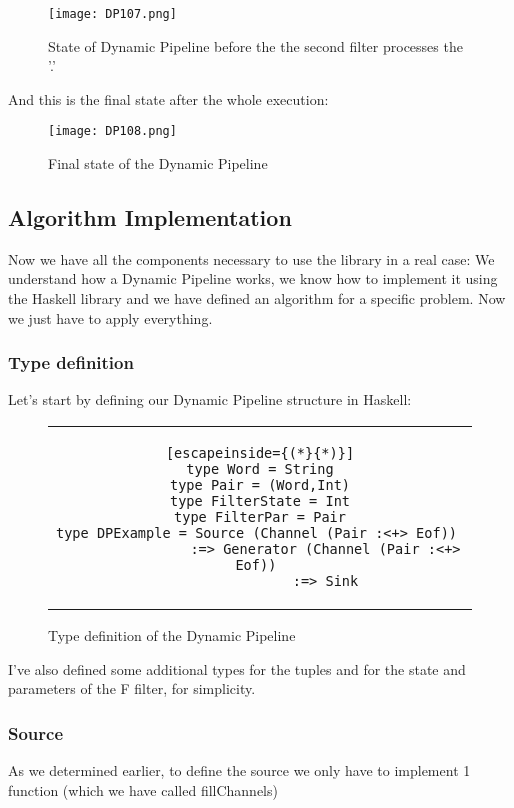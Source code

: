 \begin{figure}[H]
    \centering
    \texttt{[image: DP107.png]}
    \caption{State of Dynamic Pipeline before the the second filter processes the '.'}
    \label{fig:DP107}
\end{figure}

And this is the final state after the whole execution:

\begin{figure}[H]
    \centering
    \texttt{[image: DP108.png]}
    \caption{Final state of the Dynamic Pipeline}
    \label{fig:DP108}
\end{figure}

\subsection{Algorithm Implementation}
Now we have all the components necessary to use the library in a real case: We understand how a Dynamic Pipeline works, we know how to implement it using the Haskell library and we have defined an algorithm for a specific problem. Now we just have to apply everything.
\subsubsection*{Type definition}
Let's start by defining our Dynamic Pipeline structure in Haskell:

\begin{figure}[H]
    \begin{tabular}{c}
        \begin{lstlisting}[escapeinside={(*}{*)}]
type Word = String
type Pair = (Word,Int)
type FilterState = Int
type FilterPar = Pair
type DPExample = Source (Channel (Pair :<+> Eof)) 
                :=> Generator (Channel (Pair :<+> Eof)) 
                :=> Sink
        \end{lstlisting}
    \end{tabular}
    \caption{Type definition of the Dynamic Pipeline}
    \label{fig:HC16}
\end{figure}

I've also defined some additional types for the tuples and for the state and parameters of the F filter, for simplicity.

\subsubsection*{Source}
As we determined earlier, to define the source we only have to implement 1 function (which we have called fillChannels)

